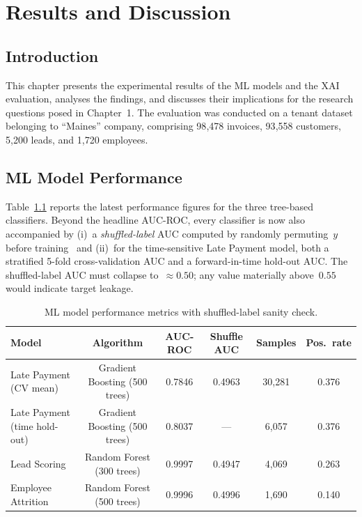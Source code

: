 \documentclass[12pt,a4paper]{report}
\begin{document}
\chapter{Results and Discussion}
\label{ch:results}

\section{Introduction}
\label{sec:results_intro}

This chapter presents the experimental results of the ML models and the XAI evaluation, analyses the findings, and discusses their implications for the research questions posed in Chapter~1. The evaluation was conducted on a tenant dataset belonging to ``Maines'' company, comprising 98{,}478 invoices, 93{,}558 customers, 5{,}200 leads, and 1{,}720 employees.

\section{ML Model Performance}
\label{sec:ml_performance}

Table~\ref{tab:ml_results} reports the latest performance figures for the three tree-based classifiers. Beyond the headline AUC-ROC, every classifier is now also accompanied by (i)~a \emph{shuffled-label} AUC computed by randomly permuting~$y$ before training~\citep{ojala2010permutation} and (ii)~for the time-sensitive Late Payment model, both a stratified 5-fold cross-validation AUC and a forward-in-time hold-out AUC. The shuffled-label AUC must collapse to~$\approx 0.50$; any value materially above~$0.55$ would indicate target leakage.

\begin{table}[H]
\centering
\caption{ML model performance metrics with shuffled-label sanity check.}
\label{tab:ml_results}
\begin{tabularx}{\textwidth}{l c c c c c}
\toprule
\textbf{Model} & \textbf{Algorithm} & \textbf{AUC-ROC} & \textbf{Shuffle AUC} & \textbf{Samples} & \textbf{Pos.\ rate} \\
\midrule
Late Payment (CV mean)        & Gradient Boosting (500 trees) & 0.7846 & 0.4963 & 30{,}281 & 0.376 \\
Late Payment (time hold-out)  & Gradient Boosting (500 trees) & 0.8037 & ---    & 6{,}057  & 0.376 \\
Lead Scoring                  & Random Forest (300 trees)     & 0.9997 & 0.4947 & 4{,}069  & 0.263 \\
Employee Attrition            & Random Forest (500 trees)     & 0.9996 & 0.4996 & 1{,}690  & 0.140 \\
\bottomrule
\end{tabularx}
\end{table}
\end{document}
